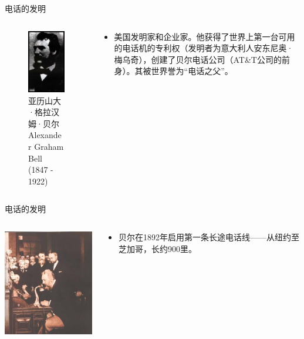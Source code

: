 \documentclass{beamer}
\begin{document}
\begin{frame}{电话的发明}
  \begin{columns}
    \begin{column}{0.4\linewidth}
    \begin{figure}
      \includegraphics[width=3.2cm]{Bell.png}
      \caption{亚历山大·格拉汉姆·贝尔Alexander Graham Bell (1847 - 1922)}
    \end{figure}
    \end{column}
    \begin{column}{0.6\linewidth}
      \begin{itemize}
        \item 美国发明家和企业家。他获得了世界上第一台可用的电话机的专利权（发明者为意大利人安东尼奥·梅乌奇），创建了贝尔电话公司（AT\&T公司的前身）。其被世界誉为“电话之父”。
      \end{itemize}
    \end{column}
  \end{columns}
\end{frame}

\begin{frame}{电话的发明}
  \begin{columns}
    \begin{column}{0.5\linewidth}
      \includegraphics[width=5.5cm]{Bell2}
    \end{column}
    \begin{column}{0.5\linewidth}
      \begin{itemize}
        \item 贝尔在1892年启用第一条长途电话线——从纽约至芝加哥，长约900里。
      \end{itemize}
    \end{column}
  \end{columns}
\end{frame}
\end{document}
